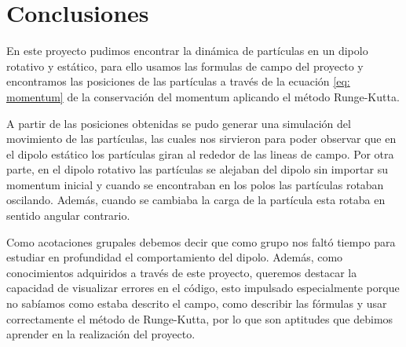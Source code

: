 \documentclass{article}
\begin{document}


\section*{Conclusiones}

En este proyecto pudimos encontrar la dinámica de partículas en un dipolo rotativo y estático, para ello usamos las formulas de campo del proyecto \cite{paper_estudio} y encontramos las posiciones de las partículas a través de la ecuación \ref{eq: momentum} de la conservación del momentum aplicando el método Runge-Kutta.

\vspace{2mm}
A partir de las posiciones obtenidas se pudo generar una simulación del movimiento de las partículas, las cuales nos sirvieron para poder observar que en el dipolo estático los partículas giran al rededor de las lineas de campo. Por otra parte, en el dipolo rotativo las partículas se alejaban del dipolo sin importar su momentum inicial y cuando se encontraban en los polos las partículas rotaban oscilando.
Además, cuando se cambiaba la carga de la partícula esta rotaba en sentido angular contrario.

\vspace{2mm}
Como acotaciones grupales debemos decir que como grupo nos faltó tiempo para estudiar en profundidad el comportamiento del dipolo. Además, como conocimientos adquiridos a través de este proyecto, queremos destacar la capacidad de visualizar errores en el código, esto impulsado especialmente porque no sabíamos como estaba descrito el campo, como describir las fórmulas y usar correctamente el método de Runge-Kutta, por lo que son aptitudes que debimos aprender en la realización del proyecto.




                    




    





\end{document}
